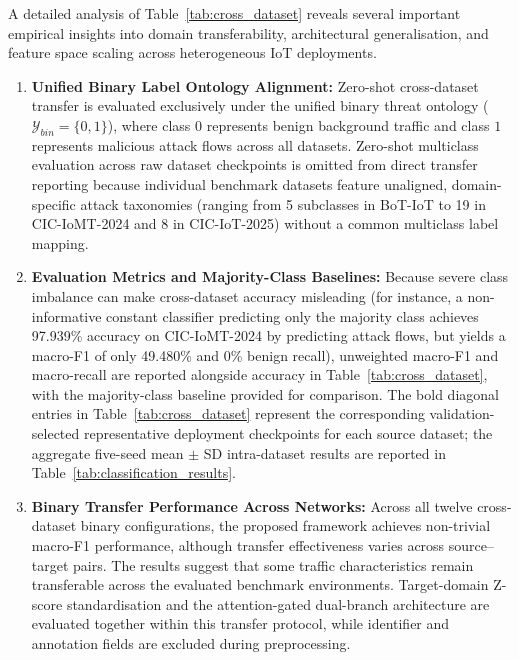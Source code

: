 \documentclass[a4paper,fleqn]{cas-sc}
\begin{document}
A detailed analysis of Table~\ref{tab:cross_dataset} reveals several important empirical insights into domain transferability, architectural generalisation, and feature space scaling across heterogeneous IoT deployments.

\begin{enumerate}
    \item \textbf{Unified Binary Label Ontology Alignment:}
    Zero-shot cross-dataset transfer is evaluated exclusively under the unified binary threat ontology ($\mathcal{Y}_{bin} = \{0, 1\}$), where class $0$ represents benign background traffic and class $1$ represents malicious attack flows across all datasets. Zero-shot multiclass evaluation across raw dataset checkpoints is omitted from direct transfer reporting because individual benchmark datasets feature unaligned, domain-specific attack taxonomies (ranging from 5 subclasses in BoT-IoT to 19 in CIC-IoMT-2024 and 8 in CIC-IoT-2025) without a common multiclass label mapping.

    \item \textbf{Evaluation Metrics and Majority-Class Baselines:}
    Because severe class imbalance can make cross-dataset accuracy misleading (for instance, a non-informative constant classifier predicting only the majority class achieves 97.939\% accuracy on CIC-IoMT-2024 by predicting attack flows, but yields a macro-F1 of only 49.480\% and 0\% benign recall), unweighted macro-F1 and macro-recall are reported alongside accuracy in Table~\ref{tab:cross_dataset}, with the majority-class baseline provided for comparison. The bold diagonal entries in Table~\ref{tab:cross_dataset} represent the corresponding validation-selected representative deployment checkpoints for each source dataset; {\color{blue}the aggregate five-seed mean $\pm$ SD intra-dataset results are reported in Table~\ref{tab:classification_results}}.

    \item \textbf{Binary Transfer Performance Across Networks:}
    {\color{blue}Across all twelve cross-dataset binary configurations, the proposed framework achieves non-trivial macro-F1 performance, although transfer effectiveness varies across source--target pairs. The results suggest that some traffic characteristics remain transferable across the evaluated benchmark environments. Target-domain Z-score standardisation and the attention-gated dual-branch architecture are evaluated together within this transfer protocol, while identifier and annotation fields are excluded during preprocessing.}


\end{enumerate}
\end{document}
